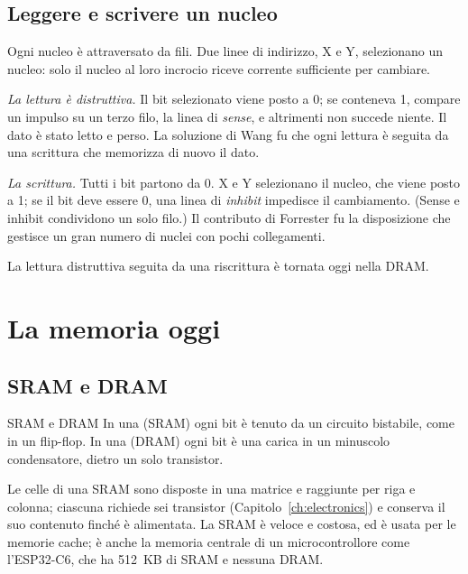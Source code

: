 \subsection{Leggere e scrivere un nucleo}

Ogni nucleo è attraversato da fili. Due linee di indirizzo, X e Y, selezionano
un nucleo: solo il nucleo al loro incrocio riceve corrente sufficiente per
cambiare.

\emph{La lettura è distruttiva.} Il bit selezionato viene posto a 0; se
conteneva 1, compare un impulso su un terzo filo, la linea di \emph{sense}, e
altrimenti non succede niente. Il dato è stato letto e perso. La soluzione di
Wang fu che ogni lettura è seguita da una scrittura che memorizza di nuovo il
dato.

\emph{La scrittura.} Tutti i bit partono da 0. X e Y selezionano il nucleo, che
viene posto a 1; se il bit deve essere 0, una linea di \emph{inhibit} impedisce
il cambiamento. (Sense e inhibit condividono un solo filo.) Il contributo di
Forrester fu la disposizione che gestisce un gran numero di nuclei con pochi
collegamenti.

La lettura distruttiva seguita da una riscrittura è tornata oggi nella DRAM.

\section{La memoria oggi}

\subsection{SRAM e DRAM}

\begin{definition}{SRAM e DRAM}
In una  (SRAM) ogni bit è tenuto da un circuito bistabile,
come in un flip-flop. In una  (DRAM) ogni bit è una carica
in un minuscolo condensatore, dietro un solo transistor.
\end{definition}

Le celle di una SRAM sono disposte in una matrice e raggiunte per riga e
colonna; ciascuna richiede sei transistor (Capitolo~\ref{ch:electronics}) e
conserva il suo contenuto finché è alimentata. La SRAM è veloce e costosa, ed è
usata per le memorie cache; è anche la memoria centrale di un microcontrollore
come l'ESP32-C6, che ha 512~KB di SRAM e nessuna DRAM.

